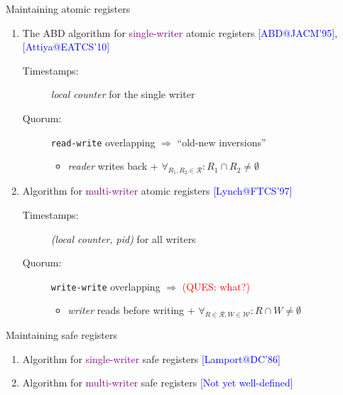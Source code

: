 \documentclass{beamer}
\makeatletter
\newcommand{\citeinbeamer}[3]{{\scriptsize{\textcolor{blue}{[#1@#2'#3]}}}}
\newcommand{\question}[1]{\textcolor{red}{(QUES: #1)}}
\newcommand{\largepurple}[1]{\textcolor{purple}{\large #1}}
\newcommand{\timestamp}[1]{\emph{\sffamily #1}}
\makeatother
\begin{document}
\begin{frame}[label = maintenance-backup]{Maintaining atomic registers
\hyperlink{maintenance-main}{}}
  \begin{enumerate}
    \item The ABD algorithm for \largepurple{single-writer} atomic registers
    \citeinbeamer{ABD}{JACM}{95},
  \citeinbeamer{Attiya}{EATCS}{10}
		\begin{description}
		  \item [Timestamps:] \timestamp{local counter} for the single writer
		  \item [Quorum:] \texttt{read-write} overlapping $\Rightarrow$ ``old-new
		  inversions''
		    \begin{itemize}
		      \item {\it reader} writes back + $\forall_{R_1, R_2 \in \mathcal{R}}:
		      R_1 \cap R_2 \neq \emptyset$
		    \end{itemize}
		\end{description}

	\vspace{0.30cm}

    \item Algorithm for \largepurple{multi-writer} atomic registers
    \citeinbeamer{Lynch}{FTCS}{97}
      \begin{description}
        \item[Timestamps:] \timestamp{(local counter, pid)} for all writers
        \item[Quorum:] \texttt{write-write} overlapping $\Rightarrow$
        \question{what?}
		   \begin{itemize}
		     \item {\it writer} reads before writing + $\forall_{R \in
		     \mathcal{R}, W \in \mathcal{W}}: R \cap W \neq \emptyset$
		   \end{itemize}
      \end{description}
  \end{enumerate}
\end{frame}
\begin{frame}{Maintaining safe registers}
  \begin{enumerate}
    \item Algorithm for \largepurple{single-writer} safe registers
    \citeinbeamer{Lamport}{DC}{86}

    \item Algorithm for \largepurple{multi-writer} safe registers
    \scriptsize{\textcolor{blue}{[Not yet well-defined]}}
  \end{enumerate}
\end{frame}
\end{document}
